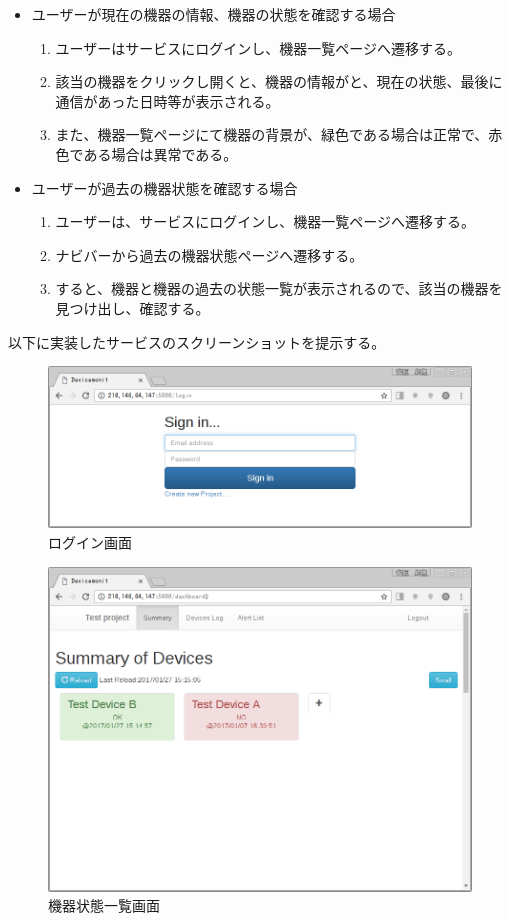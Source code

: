 \begin{itemize}
\begin{enumerate}
	\end{enumerate}
\item ユーザーが現在の機器の情報、機器の状態を確認する場合
	\begin{enumerate}
	\item ユーザーはサービスにログインし、機器一覧ページへ遷移する。
	\item 該当の機器をクリックし開くと、機器の情報がと、現在の状態、最後に通信があった日時等が表示される。
	\item また、機器一覧ページにて機器の背景が、緑色である場合は正常で、赤色である場合は異常である。
	\end{enumerate}
\item ユーザーが過去の機器状態を確認する場合
	\begin{enumerate}
	\item ユーザーは、サービスにログインし、機器一覧ページへ遷移する。
	\item ナビバーから過去の機器状態ページへ遷移する。
	\item すると、機器と機器の過去の状態一覧が表示されるので、該当の機器を見つけ出し、確認する。
	\end{enumerate}
\end{itemize}

以下に実装したサービスのスクリーンショットを提示する。

\begin{figure}[htbp]
\includegraphics[width=16cm]{images/login.png}
\caption{ログイン画面}
\label{fig:ss_login}
\end{figure}


\begin{figure}[htbp]
\includegraphics[width=16cm]{images/screenshot_summary1.png}
\caption{機器状態一覧画面}
\label{fig:ss_sum1}
\end{figure}


